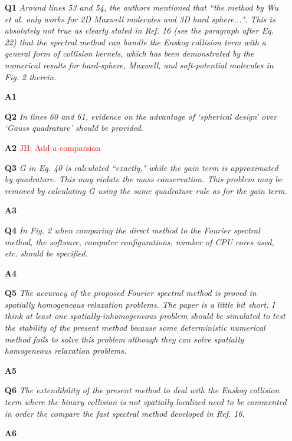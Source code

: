 \documentclass[11pt]{article}
\newcommand{\jh}[1]{\textcolor{red}{JH: #1}}
\begin{document}
\begin{itemize}
\item[{\bf Q1}]  {\it Around lines 53 and 54, the authors mentioned that ``the method by Wu et al. only works for 2D Maxwell molecules and 3D hard sphere...". This is absolutely not true as clearly stated in Ref. 16 (see the paragraph after Eq. 22) that the spectral method can handle the Enskog collision term with a general form of collision kernels, which has been demonstrated by the numerical results for hard-sphere, Maxwell, and soft-potential molecules in Fig. 2 therein.}

\item[{\bf A1}] 

\item[{\bf Q2}] {\it In lines 60 and 61, evidence on the advantage of `spherical design' over `Gauss quadrature' should be provided.}

\item[{\bf A2}]  \jh{Add a comparsion}

\item[{\bf Q3}] {\it G in Eq. 40 is calculated ``exactly," while the gain term is approximated by quadrature. This may violate the mass conservation. This problem may be removed by calculating G using the same quadrature rule as for the gain term.
}

\item[{\bf A3}] 

\item[{\bf Q4}] {\it In Fig. 2 when comparing the direct method to the Fourier spectral method, the software, computer configurations, number of CPU cores used, etc. should be specified.  }

\item[{\bf A4}] 


\item[{\bf Q5}] {\it The accuracy of the proposed Fourier spectral method is proved in spatially homogeneous relaxation problems. The paper is a little bit short. I think at least one spatially-inhomogeneous problem should be simulated to test the stability of the present method because some deterministic numerical method fails to solve this problem although they can solve spatially homogeneous relaxation problems. }

\item[{\bf A5}] 

\item[{\bf Q6}] {\it The extendibility of the present method to deal with the Enskog collision term where the binary collision is not spatially localized need to be commented in order the compare the fast spectral method developed in Ref. 16. }

\item[{\bf A6}] 


\end{itemize}
\end{document}
